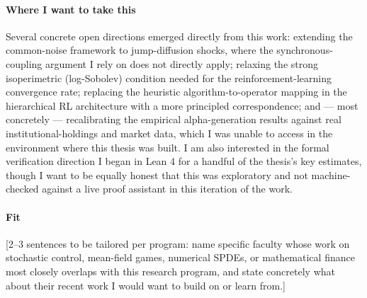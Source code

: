 \documentclass[11pt]{article}
\begin{document}
\paragraph{Where I want to take this} Several concrete open directions emerged directly from this
work: extending the common-noise framework to jump-diffusion shocks, where the
synchronous-coupling argument I rely on does not directly apply; relaxing the strong isoperimetric
(log-Sobolev) condition needed for the reinforcement-learning convergence rate; replacing the
heuristic algorithm-to-operator mapping in the hierarchical RL architecture with a more principled
correspondence; and --- most concretely --- recalibrating the empirical alpha-generation results
against real institutional-holdings and market data, which I was unable to access in the
environment where this thesis was built. I am also interested in the formal verification direction
I began in Lean 4 for a handful of the thesis's key estimates, though I want to be equally honest
that this was exploratory and not machine-checked against a live proof assistant in this iteration
of the work.

\paragraph{Fit} [2--3 sentences to be tailored per program: name specific faculty whose work on
stochastic control, mean-field games, numerical SPDEs, or mathematical finance most closely
overlaps with this research program, and state concretely what about their recent work I would
want to build on or learn from.]
\end{document}
